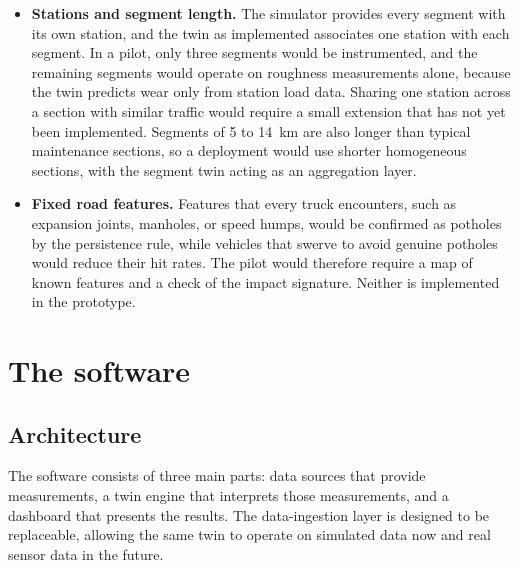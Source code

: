 \documentclass[11pt,a4paper]{article}
\begin{document}
\begin{itemize}
\item \textbf{Stations and segment length.} The simulator provides every segment with its own station, and the twin as implemented associates one station with each segment. In a pilot, only three segments would be instrumented, and the remaining segments would operate on roughness measurements alone, because the twin predicts wear only from station load data. Sharing one station across a section with similar traffic would require a small extension that has not yet been implemented. Segments of 5 to 14~km are also longer than typical maintenance sections, so a deployment would use shorter homogeneous sections, with the segment twin acting as an aggregation layer.
\item \textbf{Fixed road features.} Features that every truck encounters, such as expansion joints, manholes, or speed humps, would be confirmed as potholes by the persistence rule, while vehicles that swerve to avoid genuine potholes would reduce their hit rates. The pilot would therefore require a map of known features and a check of the impact signature. Neither is implemented in the prototype.
\end{itemize}

\section{The software}\label{sec:software}
\subsection{Architecture}
The software consists of three main parts: data sources that provide measurements, a twin engine that interprets those measurements, and a dashboard that presents the results. The data-ingestion layer is designed to be replaceable, allowing the same twin to operate on simulated data now and real sensor data in the future.
\end{document}
